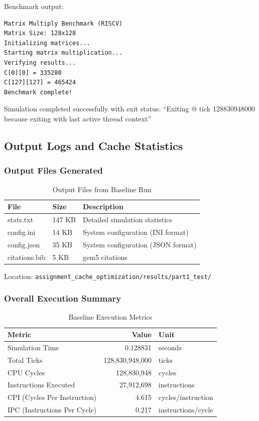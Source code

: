 \documentclass[11pt,a4paper]{article}
\begin{document}
Benchmark output:
\begin{verbatim}
Matrix Multiply Benchmark (RISCV)
Matrix Size: 128x128
Initializing matrices...
Starting matrix multiplication...
Verifying results...
C[0][0] = 335280
C[127][127] = 465424
Benchmark complete!
\end{verbatim}

Simulation completed successfully with exit status: ``Exiting @ tick 128830948000 because exiting with last active thread context''

\subsection{Output Logs and Cache Statistics}

\subsubsection{Output Files Generated}

\begin{table}[H]
\centering
\caption{Output Files from Baseline Run}
\begin{tabular}{llp{6cm}}
\toprule
\textbf{File} & \textbf{Size} & \textbf{Description} \\
\midrule
stats.txt & 147 KB & Detailed simulation statistics \\
config.ini & 14 KB & System configuration (INI format) \\
config.json & 35 KB & System configuration (JSON format) \\
citations.bib & 5 KB & gem5 citations \\
\bottomrule
\end{tabular}
\end{table}

Location: \texttt{assignment\_cache\_optimization/results/part1\_test/}

\subsubsection{Overall Execution Summary}

\begin{table}[H]
\centering
\caption{Baseline Execution Metrics}
\begin{tabular}{lrl}
\toprule
\textbf{Metric} & \textbf{Value} & \textbf{Unit} \\
\midrule
Simulation Time & 0.128831 & seconds \\
Total Ticks & 128,830,948,000 & ticks \\
CPU Cycles & 128,830,948 & cycles \\
Instructions Executed & 27,912,698 & instructions \\
CPI (Cycles Per Instruction) & 4.615 & cycles/instruction \\
IPC (Instructions Per Cycle) & 0.217 & instructions/cycle \\
\bottomrule
\end{tabular}
\end{table}
\end{document}
